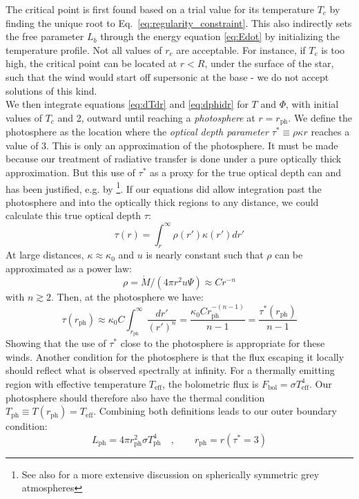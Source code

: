 \documentclass[../main.tex]{subfiles}
\newcommand{\ph}{_\text{ph}}
\newcommand{\Mdot}{\dot{M}}
\begin{document}
The critical point is first found based on a trial value for its temperature $T_c$ by finding the unique root to Eq.~\eqref{eq:regularity_constraint}. This also indirectly sets the free parameter $L_b$ through the energy equation \eqref{eq:Edot} by initializing the temperature profile. Not all values of $r_c$ are acceptable. For instance, if $T_c$ is too high, the critical point can be located at $r<R$, under the surface of the star, such that the wind would start off supersonic at the base - we do not accept solutions of this kind.\\

We then integrate equations \eqref{eq:dTdr} and \eqref{eq:dphidr} for $T$ and $\Phi$, with initial values of $T_c$ and 2, outward until reaching a \textit{photosphere} at $r=r\ph$. We define the photosphere as the location where the \textit{optical depth parameter} $\tau
^*\equiv \rho\kappa r$ reaches a value of 3. This is only an approximation of the photosphere. It must be made because our treatment of radiative transfer is done under a pure optically thick approximation. But this use of $\tau^*$ as a proxy for the true optical depth can and has been justified, e.g. by \citet{Quinn1985}\footnote{See also \citet[chapter~7.6]{Mihalas1978} for a more extensive discussion on spherically symmetric grey atmospheres}. If our equations did allow integration past the photosphere and into the optically thick regions to any distance, we could calculate this true optical depth $\tau$:
\begin{equation}
    \tau(r)=\int_r^\infty \rho(r')\kappa(r') dr'
\end{equation}
At large distances, $\kappa\approx \kappa_0$ and $u$ is nearly constant such that $\rho$ can be approximated as a power law: 
\begin{equation}
    \rho = \Mdot/(4\pi r^2 u\Psi) \approx  Cr^{-n}
\end{equation}
with $n\gtrsim 2$. Then, at the photosphere we have:
\begin{equation}\label{eq:tau_taustar_approx}
    \tau(r\ph)\approx\kappa_0C\int_{r\ph}^\infty \frac{dr'}{(r')^n}=\frac{\kappa_0 Cr\ph^{-(n-1)}}{n-1}=\frac{\tau^*(r\ph)}{n-1}
\end{equation}
Showing that the use of $\tau^*$ close to the photosphere is appropriate for these winds. Another condition for the photosphere is that the flux escaping it locally should reflect what is observed spectrally at infinity. For a thermally emitting region with effective temperature $T_\text{eff}$, the bolometric flux is $F_\text{bol}=\sigma T_\text{eff}^4$. Our photosphere should therefore also have the thermal condition $T\ph\equiv T(r\ph)=T_\text{eff}$. Combining both definitions leads to our outer boundary condition:
\begin{equation}\label{eq:wind_outerBC}
    L\ph=4\pi r\ph^2\sigma T\ph^4 \quad, \qquad r\ph=r(\tau^*=3)
\end{equation}
\end{document}
